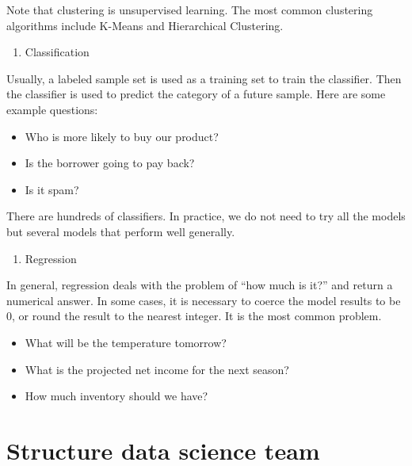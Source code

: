 \documentclass[12pt,]{krantz}
\providecommand{\tightlist}{%
  \setlength{\itemsep}{0pt}\setlength{\parskip}{0pt}}
\begin{document}
Note that clustering is unsupervised learning. The most common clustering algorithms include K-Means and Hierarchical Clustering.

\begin{enumerate}
\def\labelenumi{\arabic{enumi}.}
\setcounter{enumi}{3}
\tightlist
\item
  Classification
\end{enumerate}

Usually, a labeled sample set is used as a training set to train the classifier. Then the classifier is used to predict the category of a future sample. Here are some example questions:

\begin{itemize}
\tightlist
\item
  Who is more likely to buy our product?
\item
  Is the borrower going to pay back?
\item
  Is it spam?
\end{itemize}

There are hundreds of classifiers. In practice, we do not need to try all the models but several models that perform well generally.

\begin{enumerate}
\def\labelenumi{\arabic{enumi}.}
\setcounter{enumi}{4}
\tightlist
\item
  Regression
\end{enumerate}

In general, regression deals with the problem of ``how much is it?'' and return a numerical answer. In some cases, it is necessary to coerce the model results to be 0, or round the result to the nearest integer. It is the most common problem.

\begin{itemize}
\tightlist
\item
  What will be the temperature tomorrow?
\item
  What is the projected net income for the next season?
\item
  How much inventory should we have?
\end{itemize}

\hypertarget{structure-data-science-team}{%
\section{Structure data science team}\label{structure-data-science-team}}
\end{document}
